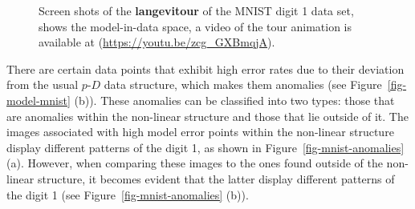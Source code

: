 \documentclass[
  12pt]{article}
\newcommand\pD{$p\text{-}D$}
\begin{document}
\begin{figure}[H]
\begin{minipage}{0.33\linewidth}
{}

\subcaption{\label{fig-mnist1_sc2}}

\end{minipage}%
%
\begin{minipage}{0.33\linewidth}


\subcaption{\label{fig-mnist1_sc3}}

\end{minipage}%

\caption{\label{fig-mnist1_sc}Screen shots of the \textbf{langevitour}
of the MNIST digit 1 data set, shows the model-in-data space, a video of
the tour animation is available at
(\url{https://youtu.be/zcg_GXBmqjA}).}

\end{figure}%

There are certain data points that exhibit high error rates due to their
deviation from the usual \pD{} data structure, which makes them
anomalies (see Figure~\ref{fig-model-mnist} (b)). These anomalies can be
classified into two types: those that are anomalies within the
non-linear structure and those that lie outside of it. The images
associated with high model error points within the non-linear structure
display different patterns of the digit 1, as shown in
Figure~\ref{fig-mnist-anomalies} (a). However, when comparing these
images to the ones found outside of the non-linear structure, it becomes
evident that the latter display different patterns of the digit 1 (see
Figure~\ref{fig-mnist-anomalies} (b)).
\end{document}
